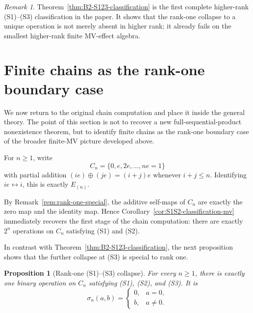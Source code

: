 \documentclass[11pt]{article}
\newtheorem{proposition}[theorem]{Proposition}
\theoremstyle{definition}
\theoremstyle{remark}
\newtheorem{remark}[theorem]{Remark}
\numberwithin{equation}{section}
\newcommand{\op}{\oplus}
\newcommand{\Cn}{C_n}
\begin{document}
\begin{remark}\label{rem:B2-contrast}
Theorem~\ref{thm:B2-S123-classification} is the first complete higher-rank \textup{(S1)}--\textup{(S3)} classification in the paper. It shows that the rank-one collapse to a unique operation is not merely absent in higher rank; it already fails on the smallest higher-rank finite MV-effect algebra.
\end{remark}

\section{Finite chains as the rank-one boundary case}\label{sec:chains}
We now return to the original chain computation and place it inside the general theory. The point of this section is not to recover a new full-sequential-product nonexistence theorem, but to identify finite chains as the rank-one boundary case of the broader finite-MV picture developed above.

For $n\ge 1$, write
\[
\Cn=\{0,e,2e,\dots,ne=1\}
\]
with partial addition $(ie)\op(je)=(i+j)e$ whenever $i+j\le n$. Identifying $ie\leftrightarrow i$, this is exactly $E_{(n)}$.

By Remark~\ref{rem:rank-one-special}, the additive self-maps of $\Cn$ are exactly the zero map and the identity map. Hence Corollary~\ref{cor:S1S2-classification-mv} immediately recovers the first stage of the chain computation: there are exactly $2^n$ operations on $\Cn$ satisfying \textup{(S1)} and \textup{(S2)}.

In contrast with Theorem~\ref{thm:B2-S123-classification}, the next proposition shows that the further collapse at \textup{(S3)} is special to rank one.

\begin{proposition}[Rank-one \textup{(S1)}--\textup{(S3)} collapse]\label{prop:chain-s123-unique}
For every $n\ge 1$, there is exactly one binary operation on $\Cn$ satisfying \textup{(S1)}, \textup{(S2)}, and \textup{(S3)}. It is
\begin{equation}\label{eq:sigma-chain}
\sigma_n(a,b)=
\begin{cases}
0,& a=0,\\
b,& a\neq 0.
\end{cases}
\end{equation}
\end{proposition}
\end{document}
